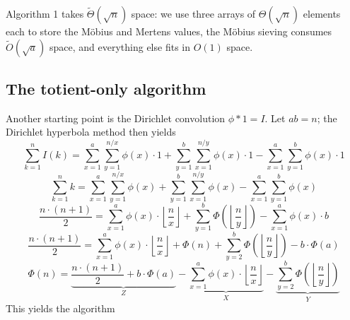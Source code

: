 \documentclass[12pt]{article}
\newcommand{\eqn}[1]{\begin{displaymath} #1 \end{displaymath}}
\newcommand{\floor}[1]{{\left\lfloor #1 \right\rfloor}}
\newcommand{\floordiv}[2]{\floor{\frac{#1}{#2}}}
\newcommand{\softO}[0]{\widetilde{O}}
\newcommand{\softTheta}[0]{\widetilde{\Theta}}
\begin{document}
Algorithm 1 takes $\softTheta(\sqrt{n})$ space: we use three arrays of $\Theta(\sqrt{n})$ elements each to store the M\"{o}bius and Mertens values, the M\"{o}bius sieving consumes $\softO(\sqrt{a})$ space, and everything else fits in $O(1)$ space.

\subsection{The totient-only algorithm}

Another starting point is the Dirichlet convolution $\phi * 1 = I$.  Let $ab=n$; the Dirichlet hyperbola method then yields
\eqn{\sum_{k=1}^n I(k) = \sum_{x=1}^a \sum_{y=1}^{n/x} \phi(x) \cdot 1 + \sum_{y=1}^b \sum_{x=1}^{n/y} \phi(x) \cdot 1 - \sum_{x=1}^a \sum_{y=1}^b \phi(x) \cdot 1}
\eqn{\sum_{k=1}^n k = \sum_{x=1}^a \sum_{y=1}^{n/x} \phi(x) + \sum_{y=1}^b \sum_{x=1}^{n/y} \phi(x) - \sum_{x=1}^a \sum_{y=1}^b \phi(x)}
\eqn{\frac{n \cdot (n+1)}{2} = \sum_{x=1}^a \phi(x) \cdot \floordiv{n}{x} + \sum_{y=1}^b \Phi\left(\floordiv{n}{y}\right) - \sum_{x=1}^a \phi(x) \cdot b}
\eqn{\frac{n \cdot (n+1)}{2} = \sum_{x=1}^a \phi(x) \cdot \floordiv{n}{x} + \Phi(n) + \sum_{y=2}^b \Phi\left(\floordiv{n}{y}\right) - b \cdot \Phi(a)}
\eqn{\Phi(n) = \underbrace{\frac{n \cdot (n+1)}{2} + b \cdot \Phi(a)}_Z - \underbrace{\sum_{x=1}^a \phi(x) \cdot \floordiv{n}{x}}_X - \underbrace{\sum_{y=2}^b \Phi\left(\floordiv{n}{y}\right)}_Y}
This yields the algorithm
\end{document}
